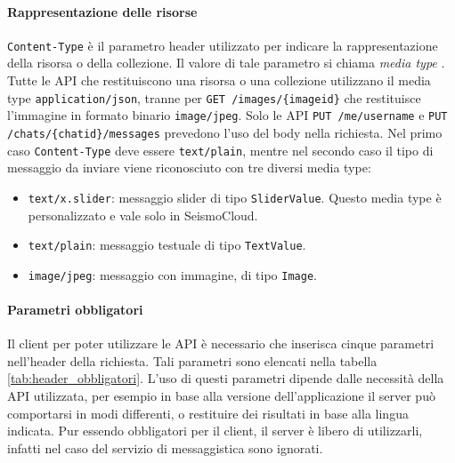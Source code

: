 \paragraph{Rappresentazione delle risorse} \texttt{Content-Type} è il parametro header utilizzato per indicare la rappresentazione della risorsa o della collezione. Il valore di tale parametro si chiama \textit{media type} \cite{mediatype-ass,mediatype-spec}. Tutte le API che restituiscono una risorsa o una collezione utilizzano il media type \texttt{application/json}, tranne per \texttt{GET /images/\{imageid\}} che restituisce l'immagine in formato binario \texttt{image/jpeg}. Solo le API \texttt{PUT /me/username} e \texttt{PUT /chats/\{chatid\}/messages} prevedono l'uso del body nella richiesta. Nel primo caso \texttt{Content-Type} deve essere \texttt{text/plain}, mentre nel secondo caso il tipo di messaggio da inviare viene riconosciuto con tre diversi media type:

\begin{itemize}
\item \texttt{text/x.slider}: messaggio slider di tipo \texttt{SliderValue}. Questo media type è personalizzato e vale solo in SeismoCloud. 
\item \texttt{text/plain}: messaggio testuale di tipo \texttt{TextValue}.
\item \texttt{image/jpeg}: messaggio con immagine, di tipo \texttt{Image}.
\end{itemize}

\paragraph{Parametri obbligatori} Il client per poter utilizzare le API è necessario che inserisca cinque parametri nell'header della richiesta. Tali parametri sono elencati nella tabella \ref{tab:header_obbligatori}. L'uso di questi parametri dipende dalle necessità della API utilizzata, per esempio in base alla versione dell'applicazione il server può comportarsi in modi differenti, o restituire dei risultati in base alla lingua indicata. Pur essendo obbligatori per il client, il server è libero di utilizzarli, infatti nel caso del servizio di messaggistica sono ignorati.

